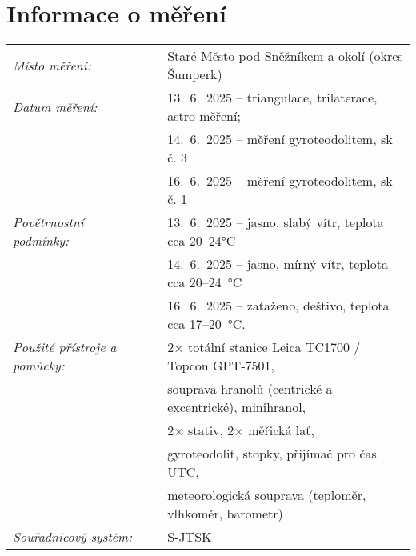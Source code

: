 \section{Informace o měření}
\begin{tabular}{lll} 
\textit{Místo měření:} & & Staré Město pod Sněžníkem a okolí (okres Šumperk)\\ 
\textit{Datum měření:} & & 13.~6.~2025 – triangulace, trilaterace, astro měření;\\
& & 14.~6.~2025 – měření gyroteodolitem, sk č. 3\\
& & 16.~6.~2025 – měření gyroteodolitem, sk č. 1\\
\textit{Povětrnostní podmínky:} & & 13.~6.~2025 – jasno, slabý vítr, teplota cca 20–24°C\\
 & & 14.~6.~2025 – jasno, mírný vítr, teplota cca 20–24~°C \\
 & & 16.~6.~2025 – zataženo, deštivo,  teplota cca 17–20~°C.\\
\textit{Použité přístroje a pomůcky:} & & 2× totální stanice Leica TC1700 / Topcon GPT‑7501,\\
& & souprava hranolů (centrické a excentrické), minihranol,\\
& & 2× stativ, 2× měřická lať,\\
& & gyroteodolit, stopky, přijímač pro čas UTC,\\
& & meteorologická souprava (teploměr, vlhkoměr, barometr)\\
\textit{Souřadnicový systém:} & & S‑JTSK\\ 
\end{tabular}
